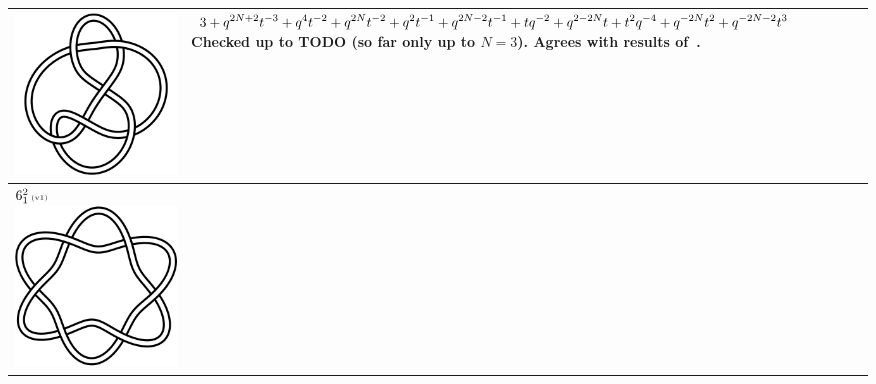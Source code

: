 \documentclass{compositio}
\theoremstyle{definition}
\numberwithin{equation}{section}
\begin{document}
{\begin{longtable}{p{}|p{}}
\includegraphics[scale=0.07,angle=0]{knot6_3.pdf} 
& 
$
\displaystyle{%
3+q^{2N+2} t^{-3} + q^4t^{-2}+ q^{2 N}t^{-2}+ q^2 t^{-1}+ q^{2 N-2}t^{-1}+ t q^{-2}+q^{2-2 N} t+ t^2q^{-4}+q^{-2 N} t^2+q^{-2N-2} t^3
}
$
\newline\newline\newline\newline
Checked up to TODO (so far only up to $N=3$). Agrees with results of~\cite{r0508510, r0607544}. 
\\
\hline
$6_{1}^2\,\text{{\tiny (v1)}}$ 
\includegraphics[scale=0.07,angle=0]{link6_1_2.pdf} 

\end{longtable}}
\end{document}

